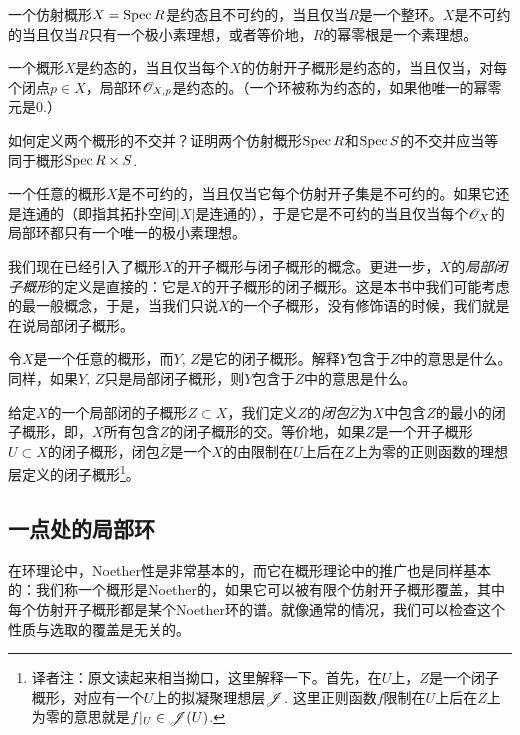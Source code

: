 \begin{exe}
	一个仿射概形$X=\operatorname{Spec} R$是约态且不可约的，当且仅当$R$是一个整环。$X$是不可约的当且仅当$R$只有一个极小素理想，或者等价地，$R$的幂零根是一个素理想。
\end{exe}

\begin{exe}
	一个概形$X$是约态的，当且仅当每个$X$的仿射开子概形是约态的，当且仅当，对每个闭点$p\in X$，局部环$\mathscr{O}_{X,p}$是约态的。（一个环被称为约态的，如果他唯一的幂零元是$0$.）
\end{exe}

\begin{exe}
	如何定义两个概形的不交并？证明两个仿射概形$\operatorname{Spec} R$和$\operatorname{Spec} S$的不交并应当等同于概形$\operatorname{Spec} R\times S$.
\end{exe}

\begin{exe}
	一个任意的概形$X$是不可约的，当且仅当它每个仿射开子集是不可约的。如果它还是连通的（即指其拓扑空间$|X|$是连通的），于是它是不可约的当且仅当每个$\mathscr{O}_X$的局部环都只有一个唯一的极小素理想。
\end{exe}

我们现在已经引入了概形$X$的开子概形与闭子概形的概念。更进一步，$X$的\textit{局部闭子概形}的定义是直接的：它是$X$的开子概形的闭子概形。这是本书中我们可能考虑的最一般概念，于是，当我们只说$X$的一个子概形，没有修饰语的时候，我们就是在说局部闭子概形。

\begin{exe}
令$X$是一个任意的概形，而$Y$, $Z$是它的闭子概形。解释$Y$包含于$Z$中的意思是什么。同样，如果$Y$, $Z$只是局部闭子概形，则$Y$包含于$Z$中的意思是什么。
\end{exe}

给定$X$的一个局部闭的子概形$Z\subset X$，我们定义$Z$的\textit{闭包}$\overline{Z}$为$X$中包含$Z$的最小的闭子概形，即，$X$所有包含$Z$的闭子概形的交。等价地，如果$Z$是一个开子概形$U\subset X$的闭子概形，闭包$\overline{Z}$是一个$X$的由限制在$U$上后在$Z$上为零的正则函数的理想层定义的闭子概形\footnote{译者注：原文读起来相当拗口，这里解释一下。首先，在$U$上，$Z$是一个闭子概形，对应有一个$U$上的拟凝聚理想层$\mathscr{J}$. 这里正则函数$f$限制在$U$上后在$Z$上为零的意思就是$f|_U\in \mathscr{J}(U)$.}。

\subsection{一点处的局部环} \label{s:1.2.2}

在环理论中，Noether性是非常基本的，而它在概形理论中的推广也是同样基本的：我们称一个概形是Noether的，如果它可以被有限个仿射开子概形覆盖，其中每个仿射开子概形都是某个Noether环的谱。就像通常的情况，我们可以检查这个性质与选取的覆盖是无关的。

